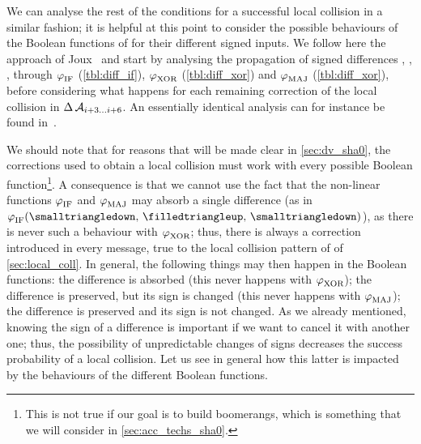 We can analyse the rest of the conditions for a successful local collision in a similar fashion; it is helpful at this point to consider the possible behaviours of the Boolean functions of \sha
for their different signed inputs. We follow here the approach of Joux~\cite[Chapter 5]{algocrypt} and start by analysing the propagation of signed differences \nodiffz, \nodiffo,
\onediffd, \onediffu through $\operatorname{\varphi}_\text{IF}$ (\autoref{tbl:diff_if}), $\operatorname{\varphi}_\text{XOR}$ (\autoref{tbl:diff_xor}) and $\operatorname{\varphi}_\text{MAJ}$ (\autoref{tbl:diff_xor}), before
considering what happens for each remaining correction of the local collision in $\operatorname{\Delta}\mathcal{A}_{i+3\ldots i+6}$.
An essentially identical analysis can for instance be found in~\cite{phdpeyrin,DBLP:journals/joc/BihamCJ15}.

We should note that for reasons that will be made clear in \autoref{sec:dv_sha0}, the corrections used to obtain a local collision must work with every possible Boolean function\footnote{This is not
true if our goal is to build boomerangs, which is something that we will consider in \autoref{sec:acc_techs_sha0}.}.
A consequence is that we cannot use the fact
that the non-linear functions $\operatorname{\varphi}_\text{IF}$ and $\operatorname{\varphi}_\text{MAJ}$ may absorb a single difference (as in \eg $\boolF_\text{IF}(\text{\nodiffz, \onediffu, \nodiffz})$),
as there is never such a behaviour with $\operatorname{\varphi}_\text{XOR}$; thus, there is always a correction introduced in every message, true to the local collision pattern
of \shiun of \autoref{sec:local_coll}. In general, the following things may then happen in the Boolean functions: the difference is absorbed (this never happens
with $\operatorname{\varphi}_\text{XOR}$);
the difference is preserved, but its sign is changed (this never happens with $\operatorname{\varphi}_\text{MAJ}$); the difference is preserved and its sign is not changed.
As we already mentioned, knowing the sign of a difference is important if we want to cancel it with another one; thus, the possibility of
unpredictable changes of signs decreases the success probability of a local collision.
Let us see in general how this latter is impacted by the behaviours of the different Boolean functions.
